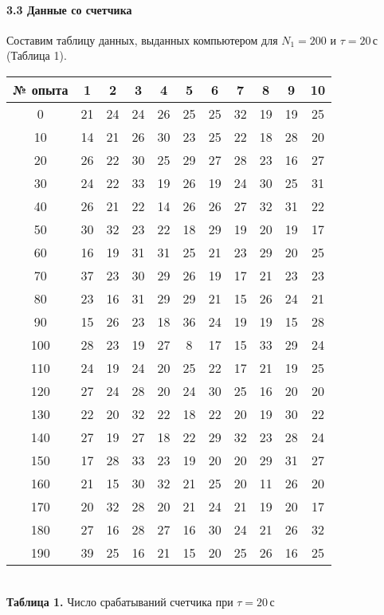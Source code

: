 \documentclass[12pt,a4paper]{scrartcl}
\begin{document}
	\paragraph{3.3 Данные со счетчика} \hfill
	\par Составим таблицу данных, выданных компьютером для $N_1 = 200$ и $\tau = 20\,$с (Таблица 1).
	\begin{center}
		\begin{tabular}{|c|c|c|c|c|c|c|c|c|c|c|}
			\hline № опыта & 1 & 2 & 3 & 4 & 5 & 6 & 7 & 8 & 9 & 10
			\\\hline 0 & 21 & 24 & 24 & 26 & 25 & 25 & 32 & 19 & 19 & 25
			\\\hline 10 & 14 & 21 & 26 & 30 & 23 & 25 & 22 & 18 & 28 & 20
			\\\hline 20 & 26 & 22 & 30 & 25 & 29 & 27 & 28 & 23 & 16 & 27
			\\\hline 30 & 24 & 22 & 33 & 19 & 26 & 19 & 24 & 30 & 25 & 31
			\\\hline 40 & 26 & 21 & 22 & 14 & 26 & 26 & 27 & 32 & 31 & 22
			\\\hline 50 & 30 & 32 & 23 & 22 & 18 & 29 & 19 & 20 & 19 & 17
			\\\hline 60 & 16 & 19 & 31 & 31 & 25 & 21 & 23 & 29 & 20 & 25
			\\\hline 70 & 37 & 23 & 30 & 29 & 26 & 19 & 17 & 21 & 23 & 23
			\\\hline 80 & 23 & 16 & 31 & 29 & 29 & 21 & 15 & 26 & 24 & 21
			\\\hline 90 & 15 & 26 & 23 & 18 & 36 & 24 & 19 & 19 & 15 & 28
			\\\hline 100 & 28 & 23 & 19 & 27 & 8 & 17 & 15 & 33 & 29 & 24
			\\\hline 110 & 24 & 19 & 24 & 20 & 25 & 22 & 17 & 21 & 19 & 25
			\\\hline 120 & 27 & 24 & 28 & 20 & 24 & 30 & 25 & 16 & 20 & 20
			\\\hline 130 & 22 & 20 & 32 & 22 & 18 & 22 & 20 & 19 & 30 & 22
			\\\hline 140 & 27 & 19 & 27 & 18 & 22 & 29 & 32 & 23 & 28 & 24
			\\\hline 150 & 17 & 28 & 33 & 23 & 19 & 20 & 20 & 29 & 31 & 27
			\\\hline 160 & 21 & 15 & 30 & 32 & 21 & 25 & 20 & 11 & 26 & 20
			\\\hline 170 & 20 & 32 & 28 & 20 & 21 & 24 & 21 & 19 & 20 & 17
			\\\hline 180 & 27 & 16 & 28 & 27 & 16 & 30 & 24 & 21 & 26 & 32
			\\\hline 190 & 39 & 25 & 16 & 21 & 15 & 20 & 25 & 26 & 16 & 25
			\\\hline 
		\end{tabular}
		\\\textbf{Таблица 1.} Число срабатываний счетчика при $\tau = 20\,$с
	\end{center}
\end{document}
